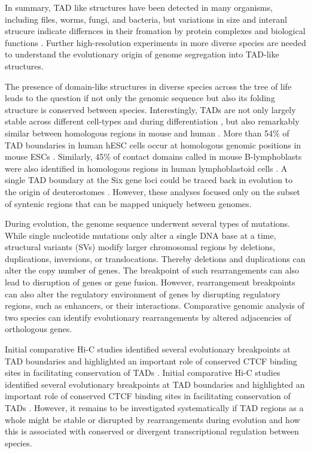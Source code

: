 \documentclass[a4paper,twoside=true,openright,parskip=full,chapterprefix=true,11pt,headings=normal,bibliography=totoc,listof=totoc,titlepage=on,captions=tableabove,draft=false]{scrreprt}
\theoremstyle{definition}
\theoremstyle{definition}
\theoremstyle{definition}
\theoremstyle{remark}
\begin{document}
In summary, TAD like structures have been detected in many organisms,
including files, worms, fungi, and bacteria, but variations in size and
interanl strucure indicate differnces in their fromation by protein
complexes and biological functions \citep{Dekker2015}. Further
high-resolution experiments in more diverse species are needed to
understand the evolutionary origin of genome segregation into TAD-like
structures.

The presence of domain-like structures in diverse species across the
tree of life leads to the question if not only the genomic sequence but
also its folding structure is conserved between species. Interestingly,
TADs are not only largely stable across different cell-types
\citep{Dixon2012, Rao2014} and during differentiation \citep{Dixon2015},
but also remarkably similar between homologous regions in mouse and
human \citep{Dixon2012}. More than 54\% of TAD boundaries in human hESC
cells occur at homologous genomic positions in mouse ESCs
\citep{Dixon2012}. Similarly, 45\% of contact domains called in mouse
B-lymphoblasts were also identified in homologous regions in human
lymphoblastoid cells \citep{Rao2014}. A single TAD boundary at the Six
gene loci could be traced back in evolution to the origin of
deuterostomes \citep{Gomez-Marin2015}. However, these analyses focused
only on the subset of syntenic regions that can be mapped uniquely
between genomes.

During evolution, the genome sequence underwent several types of
mutations. While single nucleotide mutations only alter a single DNA
base at a time, structural variants (SVs) modify larger chromosomal
regions by deletions, duplications, inversions, or translocations.
Thereby deletions and duplications can alter the copy number of genes.
The breakpoint of such rearrangements can also lead to disruption of
genes or gene fusion. However, rearrangement breakpoints can also alter
the regulatory environment of genes by disrupting regulatory regions,
such as enhancers, or their interactions. Comparative genomic analysis
of two species can identify evolutionary rearrangements by altered
adjacencies of orthologous genes.

Initial comparative Hi-C studies identified several evolutionary
breakpoints at TAD boundaries and highlighted an important role of
conserved CTCF binding sites in facilitating conservation of TADs
\citep{VietriRudan2015}. Initial comparative Hi-C studies identified
several evolutionary breakpoints at TAD boundaries and highlighted an
important role of conserved CTCF binding sites in facilitating
conservation of TADs \citep{VietriRudan2015}. However, it remains to be
investigated systematically if TAD regions as a whole might be stable or
disrupted by rearrangements during evolution and how this is associated
with conserved or divergent transcriptional regulation between species.
\end{document}
